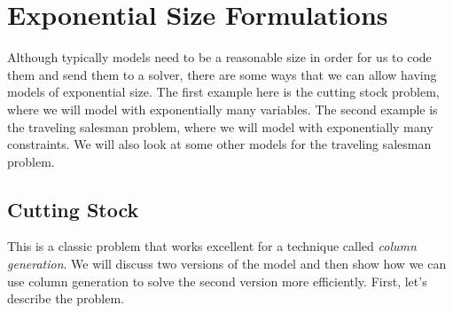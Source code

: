 
%
%

\chapter{Exponential Size Formulations}
\label{sec:exponential-IP-forumulations}

Although typically models need to be a reasonable size in order for us to code them and send them to a solver, there are some ways that we can allow having models of exponential size.  The first example here is the cutting stock problem, where we will model with exponentially many variables.  The second example is the traveling salesman problem, where we will model with exponentially many constraints.  We will also look at some other models for the traveling salesman problem.  
\section{Cutting Stock}
This is a classic problem that works excellent for a technique called \emph{column generation}.
We will discuss two versions of the model and then show how we can use column generation to solve the second version more efficiently.  First, let's describe the problem.

